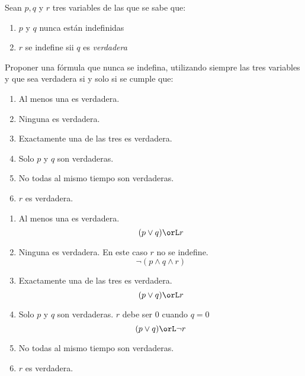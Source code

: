\begin{enunciado}{\ejercicio}
  Sean $p, q$ y $r$ tres variables de las que se sabe que:
  \begin{enumerate}[label=\tiny$\blacksquare$]
    \item $p$ y $q$ nunca están indefinidas
    \item $r$ se indefine sii $q$ es \textit{verdadera}
  \end{enumerate}
  Proponer una fórmula que nunca se indefina, utilizando siempre las tres variables y que sea verdadera si y solo si se cumple que:
  \begin{multicols}{2}
    \begin{enumerate}[label=\alph*)]
      \item Al menos una es verdadera.
      \item Ninguna es verdadera.
      \item Exactamente una de las tres es verdadera.
      \item Solo $p$ y $q$ son verdaderas.
      \item No todas al mismo tiempo son verdaderas.
      \item $r$ es verdadera.
    \end{enumerate}
  \end{multicols}
\end{enunciado}

\begin{enumerate}[label=\alph*)]
  \item Al menos una es verdadera.
        $$
          (p \lor q) \orL r
        $$

  \item Ninguna es verdadera. En este caso $r$ no se indefine.
        $$
          \neg(p \land q \land r)
        $$


  \item Exactamente una de las tres es verdadera.
        $$
          (p \lor q) \orL r
        $$

  \item Solo $p$ y $q$ son verdaderas. $r$ debe ser 0 cuando $q = 0$
        $$
          (p \lor q) \orL \neg r
        $$

  \item No todas al mismo tiempo son verdaderas.

  \item $r$ es verdadera.

\end{enumerate}

